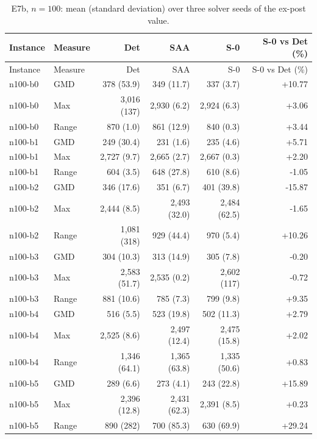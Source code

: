 \begin{small}
\begin{longtable}{llrrrr}
\caption{E7b, $n=100$: mean (standard deviation) over three solver seeds of the ex-post value.}\label{tab:app_e7b}\\
\toprule
Instance & Measure & Det & SAA & S-0 & S-0 vs Det (\%)\\
\midrule
\endfirsthead
\toprule
Instance & Measure & Det & SAA & S-0 & S-0 vs Det (\%)\\
\midrule
\endhead
\bottomrule
\endfoot
n100-b0 & GMD & 378 (53.9) & 349 (11.7) & 337 (3.7) & +10.77 \\
n100-b0 & Max & 3,016 (137) & 2,930 (6.2) & 2,924 (6.3) & +3.06 \\
n100-b0 & Range & 870 (1.0) & 861 (12.9) & 840 (0.3) & +3.44 \\
n100-b1 & GMD & 249 (30.4) & 231 (1.6) & 235 (4.6) & +5.71 \\
n100-b1 & Max & 2,727 (9.7) & 2,665 (2.7) & 2,667 (0.3) & +2.20 \\
n100-b1 & Range & 604 (3.5) & 648 (27.8) & 610 (8.6) & -1.05 \\
n100-b2 & GMD & 346 (17.6) & 351 (6.7) & 401 (39.8) & -15.87 \\
n100-b2 & Max & 2,444 (8.5) & 2,493 (32.0) & 2,484 (62.5) & -1.65 \\
n100-b2 & Range & 1,081 (318) & 929 (44.4) & 970 (5.4) & +10.26 \\
n100-b3 & GMD & 304 (10.3) & 313 (14.9) & 305 (7.8) & -0.20 \\
n100-b3 & Max & 2,583 (51.7) & 2,535 (0.2) & 2,602 (117) & -0.72 \\
n100-b3 & Range & 881 (10.6) & 785 (7.3) & 799 (9.8) & +9.35 \\
n100-b4 & GMD & 516 (5.5) & 523 (19.8) & 502 (11.3) & +2.79 \\
n100-b4 & Max & 2,525 (8.6) & 2,497 (12.4) & 2,475 (15.8) & +2.02 \\
n100-b4 & Range & 1,346 (64.1) & 1,365 (63.8) & 1,335 (50.6) & +0.83 \\
n100-b5 & GMD & 289 (6.6) & 273 (4.1) & 243 (22.8) & +15.89 \\
n100-b5 & Max & 2,396 (12.8) & 2,431 (62.3) & 2,391 (8.5) & +0.23 \\
n100-b5 & Range & 890 (282) & 700 (85.3) & 630 (69.9) & +29.24 \\
\end{longtable}
\end{small}
